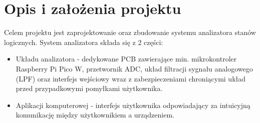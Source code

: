 \section{Opis i założenia projektu}
    Celem projektu jest zaprojektowanie oraz zbudowanie systemu analizatora stanów logicznych.
    System analizatora składa się z 2 części:
    \begin{itemize}
        \item Układu analizatora - dedykowane PCB zawierające min. mikrokontroler
        Raspberry Pi Pico W, przetwornik ADC, układ filtracji sygnału analogowego (LPF)
        oraz interfejs wejściowy wraz z zabezpieczeniami chroniącymi układ przed przypadkowymi
        pomyłkami użytkownika.
        \item Aplikacji komputerowej - interfejs użytkownika odpowiadający za intuicyjną
        komunikację między użytkownikiem a urządzeniem. 
    \end{itemize}

